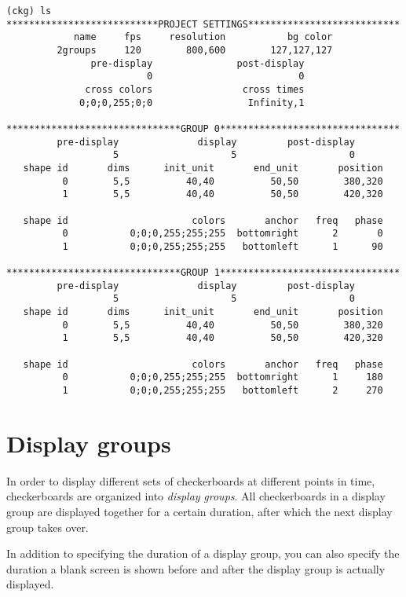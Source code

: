 \documentclass[12pt,titlepage]{article}
\begin{document}
{
\small
\begin{lstlisting}
(ckg) ls
***************************PROJECT SETTINGS***************************
            name     fps     resolution           bg color
         2groups     120        800,600        127,127,127
               pre-display               post-display
                         0                          0
              cross colors                cross times
             0;0;0,255;0;0                 Infinity,1

*******************************GROUP 0********************************
         pre-display              display         post-display
                   5                    5                    0
   shape id       dims      init_unit       end_unit       position
          0        5,5          40,40          50,50        380,320
          1        5,5          40,40          50,50        420,320

   shape id                      colors       anchor   freq   phase
          0           0;0;0,255;255;255  bottomright      2       0
          1           0;0;0,255;255;255   bottomleft      1      90

*******************************GROUP 1********************************
         pre-display              display         post-display
                   5                    5                    0
   shape id       dims      init_unit       end_unit       position
          0        5,5          40,40          50,50        380,320
          1        5,5          40,40          50,50        420,320

   shape id                      colors       anchor   freq   phase
          0           0;0;0,255;255;255  bottomright      1     180
          1           0;0;0,255;255;255   bottomleft      2     270
\end{lstlisting}
}

\section{Display groups}

In order to display different sets of checkerboards at different
points in time, checkerboards are organized into \emph{display}
\emph{groups}. All checkerboards in a display group are displayed
together for a certain duration, after which the next display group
takes over.

In addition to specifying the duration of a display group, you can
also specify the duration a blank screen is shown before and
after the display group is actually displayed.
\end{document}
